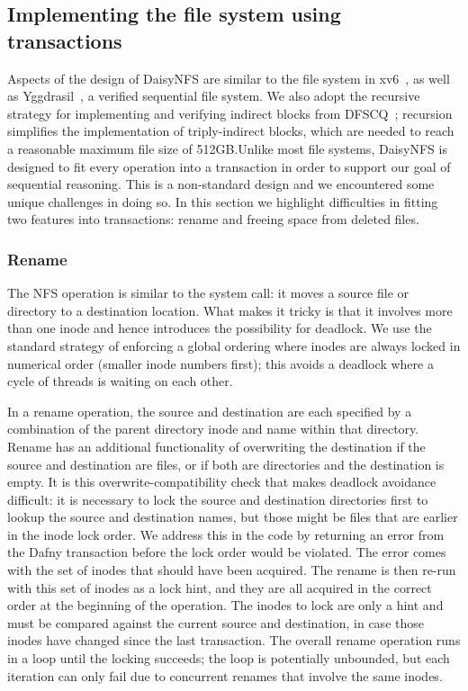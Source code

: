 \subsection{Implementing the file system using transactions}

Aspects of the design of DaisyNFS are similar to the file system in xv6~\cite{xv6},
as well as Yggdrasil~\cite{sigurbjarnarson:yggdrasil}, a verified sequential
file system. We also adopt the recursive strategy for implementing and
verifying indirect blocks from DFSCQ~\cite{akonradi-meng}; recursion simplifies
the implementation of triply-indirect blocks, which are needed to reach a
reasonable maximum file size of 512GB.\@ Unlike most file systems, DaisyNFS is designed
to fit every operation into a transaction in order to support our goal of
sequential reasoning. This is a non-standard design and we encountered some
unique challenges in doing so. In this section we highlight difficulties in
fitting two features into transactions: rename and freeing space from deleted
files.

\subsubsection{Rename}
\label{sec:dafny:rename}

The NFS  operation is similar to the  system call: it moves a
source file or directory to a destination location. What makes it tricky is that
it involves more than one inode and hence introduces the possibility for
deadlock.
We
use the standard strategy of enforcing a global ordering where inodes are always
locked in numerical order (smaller inode numbers first); this avoids a deadlock
where a cycle of threads is waiting on each other.

In a rename operation, the source and destination are each specified by a
combination of the parent directory inode and name within that directory. Rename
has an additional functionality of overwriting the destination if the source and
destination are files, or if both are directories and the destination is empty.
It is this overwrite-compatibility check that makes deadlock avoidance difficult: it is necessary
to lock the source and destination directories first to lookup the source and
destination names, but those might be files that are earlier in the inode lock
order. We address this in the code by returning an error from the Dafny
transaction before the lock order would be violated. The error comes with the
set of inodes that should have been acquired.  The rename is then re-run with
this set of inodes as a lock hint, and they are all acquired in the correct
order at the beginning of the operation. The inodes to lock are only a hint and must be compared
against the current source and destination, in case those inodes have changed
since the last transaction. The overall rename operation runs in a loop until
the locking succeeds;
the loop is potentially unbounded, but each iteration can only fail due to
concurrent renames that involve the same inodes.

